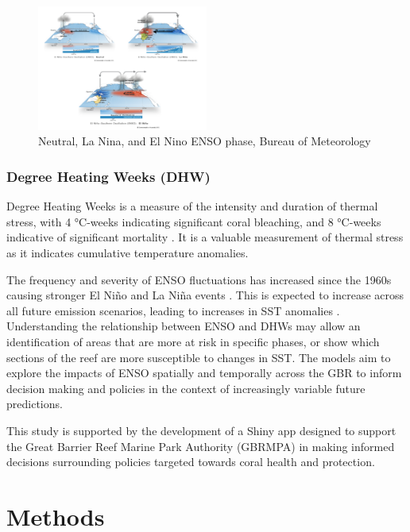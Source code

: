 \documentclass[letterpaper,9pt,twocolumn,twoside,]{pinp}
\begin{document}
\begin{figure}[H]
\centering
\includegraphics[width=0.5\textwidth]{report_images/enso_cycles.png}
\caption{Neutral, La Nina, and El Nino ENSO phase, Bureau of Meteorology}
\end{figure}

\subsubsection{Degree Heating Weeks
(DHW)}\label{degree-heating-weeks-dhw}

Degree Heating Weeks is a measure of the intensity and duration of
thermal stress, with 4 °C-weeks indicating significant coral bleaching,
and 8 °C-weeks indicative of significant mortality
\citet{NOAA_CRW_Methodology}. It is a valuable measurement of thermal
stress as it indicates cumulative temperature anomalies.

The frequency and severity of ENSO fluctuations has increased since the
1960s causing stronger El Niño and La Niña events \citet{Cai2023}. This
is expected to increase across all future emission scenarios, leading to
increases in SST anomalies \citet{Cai2022}. Understanding the
relationship between ENSO and DHWs may allow an identification of areas
that are more at risk in specific phases, or show which sections of the
reef are more susceptible to changes in SST. The models aim to explore
the impacts of ENSO spatially and temporally across the GBR to inform
decision making and policies in the context of increasingly variable
future predictions.

This study is supported by the development of a Shiny app designed to
support the Great Barrier Reef Marine Park Authority (GBRMPA) in making
informed decisions surrounding policies targeted towards coral health
and protection.

\section{Methods}\label{methods}
\end{document}
